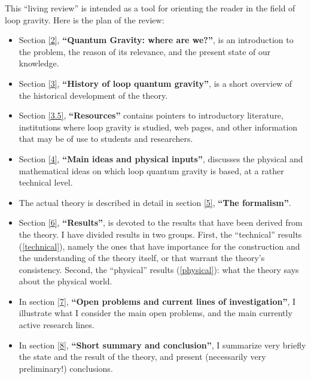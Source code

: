 \documentclass[12pt]{article}
\begin{document}
This ``living review'' is intended as a tool for orienting the 
reader in the field of loop gravity.  Here is the plan of the 
review:

\begin{itemize}

\item Section \ref{2}, \textbf{``Quantum Gravity: where are we?''}, is 
an introduction to the problem, the reason of its 
relevance, and the present state of our knowledge.

\item Section \ref{3}, \textbf{``History of loop quantum gravity''}, is 
a short overview of the historical development of the theory. 

\item Section \ref{3.5}, \textbf{``Resources''} contains pointers to 
introductory literature, institutions where loop gravity is 
studied, web pages, and other information that may be of use to 
students and researchers.

\item Section \ref{4}, \textbf{``Main ideas and physical inputs''}, 
discusses the physical and mathematical ideas on which loop 
quantum gravity is based, at a rather technical level.

\item The actual theory is described in detail in section \ref{5}, 
\textbf{``The formalism''}. 

\item Section \ref{6}, \textbf{``Results''}, is devoted to the results 
that have been derived from the theory.  I have divided results in two 
groups.  First, the ``technical'' results (\ref{technical}), namely the 
ones that have importance for the construction and the understanding 
of the theory itself, or that warrant the theory's consistency.  
Second, the ``physical'' results (\ref{physical}): what the theory says 
about the physical world.

\item In section \ref{7}, \textbf{``Open problems and current 
lines of investigation''}, I illustrate what I consider the main 
open problems, and the main currently active research lines.

\item In section \ref{8}, \textbf{``Short summary and 
conclusion''}, I summarize very briefly the state and the result 
of the theory, and present (necessarily very preliminary!)  
conclusions.

\end{itemize}
\end{document}
